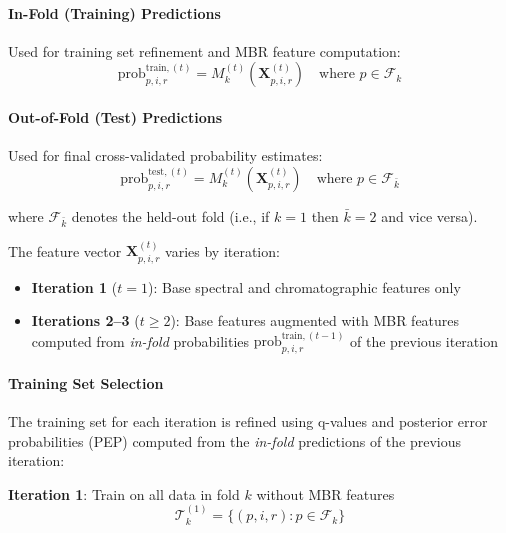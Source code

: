 \documentclass[pdflatex,sn-nature]{sn-jnl}
\begin{document}
\paragraph{In-Fold (Training) Predictions} Used for training set refinement and MBR feature computation:
\begin{equation}
  \text{prob}_{p,i,r}^{\text{train},(t)} = M_k^{(t)}(\mathbf{X}_{p,i,r}^{(t)}) \quad \text{where } p \in \mathcal{F}_k
\end{equation}

\paragraph{Out-of-Fold (Test) Predictions} Used for final cross-validated probability estimates:
\begin{equation}
  \text{prob}_{p,i,r}^{\text{test},(t)} = M_k^{(t)}(\mathbf{X}_{p,i,r}^{(t)}) \quad \text{where } p \in \mathcal{F}_{\bar{k}}
\end{equation}

where $\mathcal{F}_{\bar{k}}$ denotes the held-out fold (i.e., if $k=1$ then $\bar{k}=2$ and vice versa).

The feature vector $\mathbf{X}_{p,i,r}^{(t)}$ varies by iteration:
\begin{itemize}
  \item \textbf{Iteration 1} ($t=1$): Base spectral and chromatographic features only
  \item \textbf{Iterations 2--3} ($t \geq 2$): Base features augmented with MBR features computed from \emph{in-fold} probabilities $\text{prob}_{p,i,r}^{\text{train},(t-1)}$ of the previous iteration
\end{itemize}

\paragraph{Training Set Selection} The training set for each iteration is refined using q-values and posterior error probabilities (PEP) computed from the \emph{in-fold} predictions of the previous iteration:

\textbf{Iteration 1}: Train on all data in fold $k$ without MBR features
\begin{equation}
  \mathcal{T}_{k}^{(1)} = \{(p,i,r) : p \in \mathcal{F}_{k}\}
\end{equation}
\end{document}
